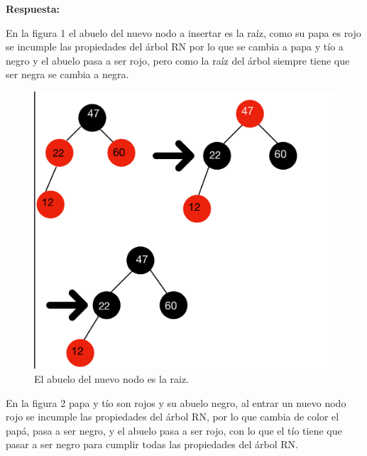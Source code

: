 \documentclass[11pt]{article}
\begin{document}
\begin{itemize}
\textbf{Respuesta:}

En la figura 1 el abuelo del nuevo nodo a insertar es la raíz, como su papa es rojo se incumple las propiedades del árbol RN por lo que se cambia a papa y tío a negro y el abuelo pasa a ser rojo, pero como la raíz del árbol siempre tiene que ser negra se cambia a negra.
\begin{figure}
    \centering
    \includegraphics[scale=.15]{IMG-2099.jpg}
    \caption{El abuelo del nuevo nodo es la raiz.}
    \label{}
 \end{figure}
En la figura 2 papa y tío son rojos y su abuelo negro, al entrar  un nuevo nodo rojo se incumple las propiedades del árbol RN, por lo que  cambia de color el papá, pasa a ser negro, y el abuelo pasa a ser rojo, con lo que el tío tiene que pasar a ser negro para cumplir todas las propiedades del árbol RN.   


\end{itemize}
\end{document}
